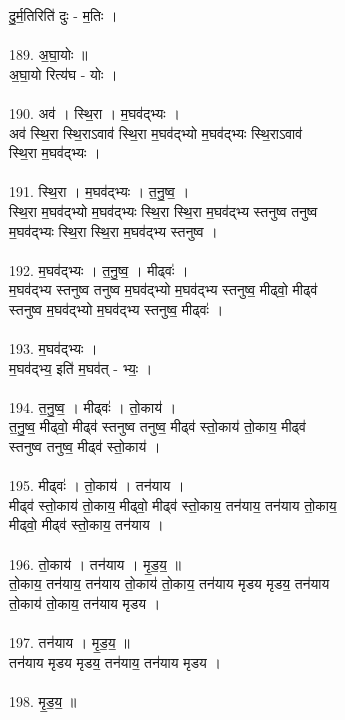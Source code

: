दु॒र्म॒तिरिति॑ दुः - म॒तिः ।\\
\\
189. अ॒घा॒योः ॥\\
अ॒घा॒यो रित्य॑घ - योः ।\\
\\
190. अव॑ । स्थि॒रा । म॒घव॑द्भ्यः ।\\
अव॑ स्थि॒रा स्थि॒राऽवाव॑ स्थि॒रा म॒घव॑द्भ्यो म॒घव॑द्भ्यः स्थि॒राऽवाव॑\\
स्थि॒रा म॒घव॑द्भ्यः ।\\
\\
191. स्थि॒रा । म॒घव॑द्भ्यः । त॒नु॒ष्व॒ ।\\
स्थि॒रा म॒घव॑द्भ्यो म॒घव॑द्भ्यः स्थि॒रा स्थि॒रा म॒घव॑द्भ्य स्तनुष्व तनुष्व\\
म॒घव॑द्भ्यः स्थि॒रा स्थि॒रा म॒घव॑द्भ्य स्तनुष्व ।\\
\\
192. म॒घव॑द्भ्यः । त॒नु॒ष्व॒ । मीढ्वः॑ ।\\
म॒घव॑द्भ्य स्तनुष्व तनुष्व म॒घव॑द्भ्यो म॒घव॑द्भ्य स्तनुष्व॒ मीढ्वो॒ मीढ्व॑\\
स्तनुष्व म॒घव॑द्भ्यो म॒घव॑द्भ्य स्तनुष्व॒ मीढ्वः॑ ।\\
\\
193. म॒घव॑द्भ्यः ।\\
म॒घव॑द्भ्य॒ इति॑ म॒घव॑त् - भ्यः॒ ।\\
\\
194. त॒नु॒ष्व॒ । मीढ्वः॑ । तो॒काय॑ ।\\
त॒नु॒ष्व॒ मीढ्वो॒ मीढ्व॑ स्तनुष्व तनुष्व॒ मीढ्व॑ स्तो॒काय॑ तो॒काय॒ मीढ्व॑\\
स्तनुष्व तनुष्व॒ मीढ्व॑ स्तो॒काय॑ ।\\
\\
195. मीढ्वः॑ । तो॒काय॑ । तन॑याय ।\\
मीढ्व॑ स्तो॒काय॑ तो॒काय॒ मीढ्वो॒ मीढ्व॑ स्तो॒काय॒ तन॑याय॒ तन॑याय तो॒काय॒\\
मीढ्वो॒ मीढ्व॑ स्तो॒काय॒ तन॑याय ।\\
\\
196. तो॒काय॑ । तन॑याय । मृ॒ड॒य॒ ॥\\
तो॒काय॒ तन॑याय॒ तन॑याय तो॒काय॑ तो॒काय॒ तन॑याय मृडय मृडय॒ तन॑याय\\
तो॒काय॑ तो॒काय॒ तन॑याय मृडय ।\\
\\
197. तन॑याय । मृ॒ड॒य॒ ॥\\
तन॑याय मृडय मृडय॒ तन॑याय॒ तन॑याय मृडय ।\\
\\
198. मृ॒ड॒य॒ ॥\\
